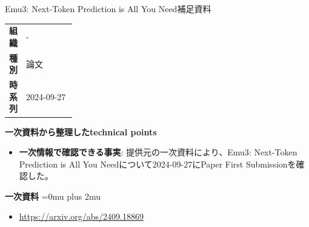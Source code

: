 \begin{technicalnote}{Emu3: Next-Token Prediction is All You Need}{補足資料}
\begingroup
\begin{tabularx}{\linewidth}{@{}>{\bfseries}p{0.22\linewidth}X@{}}
組織 & - \\
種別 & 論文 \\
時系列 & 2024-09-27 \\
\end{tabularx}
\smallskip
{\bfseries 一次資料から整理したtechnical points}
\begin{itemize}[leftmargin=1.5em,itemsep=0.35em]
\item \textbf{一次情報で確認できる事実}: 提供元の一次資料により、Emu3: Next-Token Prediction is All You Needについて2024-09-27にPaper First Submissionを確認した。
\end{itemize}
\begin{minipage}{\linewidth}
\begin{samepage}
{\bfseries 一次資料}
\begingroup\sloppy
\Urlmuskip=0mu plus 2mu\relax
\begin{itemize}[leftmargin=1.5em,itemsep=0.25em]
\item {\scriptsize\url{https://arxiv.org/abs/2409.18869}}
\end{itemize}
\endgroup
\end{samepage}
\end{minipage}
\endgroup
\end{technicalnote}
\medskip

